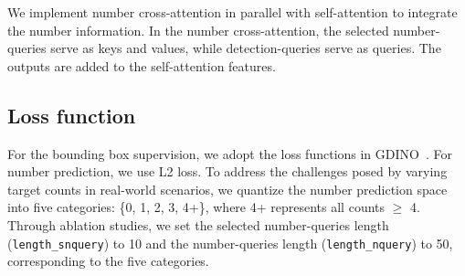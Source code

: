 We implement number cross-attention in parallel with self-attention to integrate the number information. In the number cross-attention, the selected number-queries serve as keys and values, while detection-queries serve as queries. The outputs are added to the self-attention features.




\subsection{Loss function}
For the bounding box supervision, we adopt the loss functions in GDINO~\cite{gdino}. For number prediction, we use L2 loss. To address the challenges posed by varying target counts in real-world scenarios, we quantize the number prediction space into five categories: \{0, 1, 2, 3, 4+\}, where 4+ represents all counts $\geq$ 4. Through ablation studies, we set the selected number-queries length (\texttt{length\_snquery}) to 10 and the number-queries length (\texttt{length\_nquery}) to 50, corresponding to the five categories.

